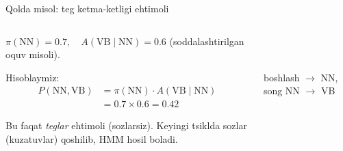 \documentclass[aspectratio=169,11pt]{beamer}
\newcommand{\uzq}{\textquotesingle{}}
\begin{document}
\begin{frame}{Qo\uzq{}lda misol: teg ketma-ketligi ehtimoli}
\footnotesize

\begin{columns}[c,totalwidth=\textwidth]
\begin{column}{0.52\textwidth}
$\pi(\mathrm{NN})=0.7,\quad A(\mathrm{VB}\mid \mathrm{NN})=0.6$
\;\footnotesize(soddalashtirilgan o\uzq{}quv misoli).

\vspace{4pt}
Hisoblaymiz:
\begin{align*}
P(\mathrm{NN},\mathrm{VB}) &= \pi(\mathrm{NN})\cdot A(\mathrm{VB}\mid \mathrm{NN})\\
                           &= 0.7 \times 0.6 = \mathbf{0.42}
\end{align*}

\vspace{2pt}
Bu faqat \emph{teglar} ehtimoli (so\uzq{}zlarsiz). Keyingi tsiklda so\uzq{}zlar
(kuzatuvlar) qo\uzq{}shilib, HMM hosil bo\uzq{}ladi.
\end{column}

\begin{column}{0.46\textwidth}
\centering
{}\\[4pt]
\\[2pt]
{\scriptsize boshlash $\to$ NN, so\uzq{}ng NN $\to$ VB}
\end{column}
\end{columns}

\end{frame}
\end{document}
